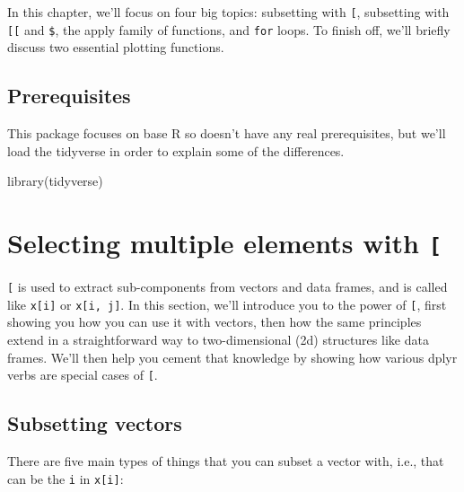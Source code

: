 \documentclass[
  letterpaper,
  DIV=11,
  numbers=noendperiod]{scrreprt}
\newenvironment{Shaded}{\begin{snugshade}}{\end{snugshade}}
\newcommand{\FunctionTok}[1]{\textcolor[rgb]{0.28,0.35,0.67}{#1}}
\newcommand{\NormalTok}[1]{\textcolor[rgb]{0.00,0.23,0.31}{#1}}
\begin{document}
In this chapter, we'll focus on four big topics: subsetting with
\texttt{{[}}, subsetting with \texttt{{[}{[}} and \texttt{\$}, the apply
family of functions, and \texttt{for} loops. To finish off, we'll
briefly discuss two essential plotting functions.

\hypertarget{prerequisites}{%
\subsection{Prerequisites}\label{prerequisites}}

This package focuses on base R so doesn't have any real prerequisites,
but we'll load the tidyverse in order to explain some of the
differences.

\begin{Shaded}
\begin{Highlighting}[]
\FunctionTok{library}\NormalTok{(tidyverse)}
\end{Highlighting}
\end{Shaded}

\hypertarget{sec-subset-many}{%
\section{\texorpdfstring{Selecting multiple elements with
\texttt{{[}}}{Selecting multiple elements with {[}}}\label{sec-subset-many}}

\texttt{{[}} is used to extract sub-components from vectors and data
frames, and is called like \texttt{x{[}i{]}} or \texttt{x{[}i,\ j{]}}.
In this section, we'll introduce you to the power of \texttt{{[}}, first
showing you how you can use it with vectors, then how the same
principles extend in a straightforward way to two-dimensional (2d)
structures like data frames. We'll then help you cement that knowledge
by showing how various dplyr verbs are special cases of \texttt{{[}}.

\hypertarget{subsetting-vectors}{%
\subsection{Subsetting vectors}\label{subsetting-vectors}}

There are five main types of things that you can subset a vector with,
i.e., that can be the \texttt{i} in \texttt{x{[}i{]}}:
\end{document}
